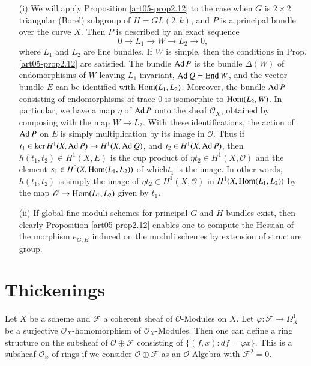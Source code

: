 \begin{remarks}\label{art05-rems2.13}
\begin{itemize}
\item[(i)] We will apply Proposition \ref{art05-prop2.12} to the case
when $G$ is $2\times 2$ triangular (Borel) subgroup of $H=GL(2,k)$,
and $P$ is a principal bundle over the curve $X$. Then $P$ is
described by an exact sequence
$$
0\to L_{1}\to W\to L_{2}\to 0,
$$
where $L_{1}$ and $L_{2}$ are line bundles. If $W$ is simple, then the
conditions in Prop. \ref{art05-prop2.12} are satisfied. The bundle
$\operatorname{Ad} P$ is the bundle $\Delta(W)$ of endomorphisms of $W$ leaving
$L_{1}$ invariant, $\operatorname{Ad} Q=\operatorname{End} W$, and the vector bundle $E$ can be
identified with $\operatorname{Hom}(L_{1},L_{2})$. Moreover, the bundle $\operatorname{Ad} P$
consisting of endomorphisms of trace $0$ is isomorphic to
$\operatorname{Hom}(L_{2},W)$. In particular, we have a map $\eta$ of $\operatorname{Ad} P$ onto
the sheaf $\mathscr{O}_{X}$, obtained by composing with the map $W\to
L_{2}$. With these identifications, the action of $\operatorname{Ad} P$ on $E$ is
simply multiplication by its image in $\mathscr{O}$. Thus if
$t_{1}\in \ker H^{1}(X,\operatorname{Ad} P)\to H^{1}(X,\operatorname{Ad} Q)$, and $t_{2}\in
H^{1}(X,\operatorname{Ad} P)$, then $h(t_{1},t_{2})\in H^{1}(X,E)$ is the cup
product of $\eta t_{2}\in H^{1}(X,\mathscr{O})$ and the element
$s_{1}\in H^{0}(X,\operatorname{Hom}(L_{1},L_{2}))$ of which\pageoriginale $t_{1}$ is the
image. In other words, $h(t_{1},t_{2})$ is simply the image of $\eta
t_{2}\in H^{1}(X,\mathscr{O})$ in $H^{1}(X,\operatorname{Hom} (L_{1},L_{2}))$ by the
map $\mathscr{O}\to \operatorname{Hom}(L_{1},L_{2})$ given by $t_{1}$.

\item[(ii)] If global fine moduli schemes for principal $G$ and $H$
bundles exist, then clearly Proposition \ref{art05-prop2.12} enables
one to compute the Hessian of the morphism $e_{G,H}$ induced on
the moduli schemes by extension of structure group.
\end{itemize}
\end{remarks}

\section{Thickenings}\label{art05-sec3}

Let $X$ be a scheme and $\mathscr{F}$ a coherent sheaf of
$\mathscr{O}$-Modules on $X$. Let
$\varphi:\mathscr{F}\to \Omega^{1}_{X}$ be a surjective
$\mathscr{O}_{X}$-homomorphism of $\mathscr{O}_{X}$-Modules. Then one
can define a ring structure on the subsheaf of
$\mathscr{O}\oplus \mathscr{F}$ consisting of $\{(f,x):df=\varphi
x\}$. This is a subsheaf $\mathscr{O}_{\varphi}$ of rings if we
consider $\mathscr{O}\oplus \mathscr{F}$ as an $\mathscr{O}$-Algebra
with $\mathscr{F}^{2}=0$.

